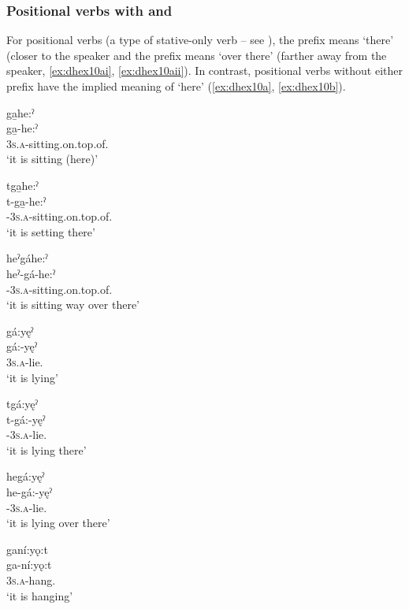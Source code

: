 \newpage
\subsubsection*{Positional verbs with  {\cislocative} and  \textsc{\translocative}} \label{Positional verbs with [d-] (cislocative) and [heˀ-] (translocative)}
For positional verbs (a type of stative-only verb -- see ), the  prefix means ‘there’ (closer to the speaker and the  prefix means ‘over there’ (farther away from the speaker, \ref{ex:dhex10ai}, \ref{ex:dhex10aii}). In contrast, positional verbs without either prefix have the implied meaning of ‘here’ (\ref{ex:dhex10a}, \ref{ex:dhex10b}).

\ea\label{ex:dhex10} 

\ea\label{ex:dhex10a} ga̱he:ˀ\\
\gll ga̱-he:ˀ\\
\textsc{3s.a}-sitting.on.top.of.{\stative}\\
\glt `it is sitting (here)'

\ea tga̱he:ˀ\\ \label{ex:dhex10ai}
\gll t-ga̱-he:ˀ\\
{\cislocative}-\textsc{3s.a}-sitting.on.top.of.{\stative}\\
\glt `it is setting there'

\ex\label{ex:dhex10aii} heˀgáhe:ˀ\\
\gll heˀ-gá-he:ˀ\\
{\translocative}-\textsc{3s.a}-sitting.on.top.of.{\stative}\\
\glt `it is sitting way over there'
\z

\ex gá:yęˀ\\ \label{ex:dhex10b}
\gll gá:-yęˀ\\
\textsc{3s.a}-lie.{\stative}\\
\glt `it is lying'

\ea tgá:yęˀ\\
\gll t-gá:-yęˀ\\
{\cislocative}-\textsc{3s.a}-lie.{\stative}\\
\glt `it is lying there'

\ex hegá:yęˀ\\
\gll he-gá:-yęˀ\\
{\translocative}-\textsc{3s.a}-lie.{\stative}\\
\glt `it is lying over there'
\z

\ex ganí:yǫ:t\\
\gll ga-ní:yǫ:t\\
\textsc{3s.a}-hang.{\stative}\\
\glt `it is hanging'

